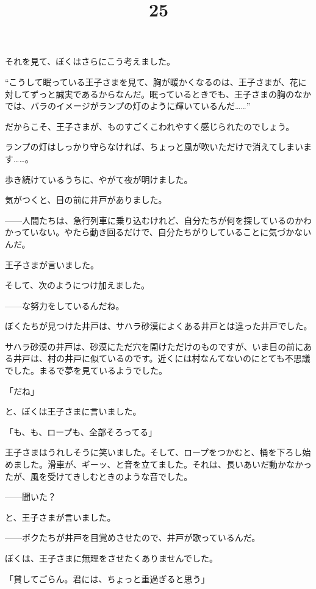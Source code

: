 それを見て、ぼくはさらにこう考えました。

“こうして眠っている王子さまを見て、胸が暖かくなるのは、王子さまが、花に対してずっと誠実であるからなんだ。眠っているときでも、王子さまの胸のなかでは、バラのイメージがランプの灯のように輝いているんだ……”

だからこそ、王子さまが、ものすごくこわれやすく感じられたのでしょう。

ランプの灯はしっかり守らなければ、ちょっと風が吹いただけで消えてしまいます……。

歩き続けているうちに、やがて夜が明けました。

気がつくと、目の前に井戸がありました。


\title{25}

——人間たちは、急行列車に乗り込むけれど、自分たちが何を探しているのかわかっていない。やたら動き回るだけで、自分たちがりしていることに気づかないんだ。

王子さまが言いました。

そして、次のようにつけ加えました。

——な努力をしているんだね。

ぼくたちが見つけた井戸は、サハラ砂漠によくある井戸とは違った井戸でした。

サハラ砂漠の井戸は、砂漠にただ穴を開けただけのものですが、いま目の前にある井戸は、村の井戸に似ているのです。近くには村なんてないのにとても不思議でした。まるで夢を見ているようでした。

「だね」

と、ぼくは王子さまに言いました。

「も、も、ロープも、全部そろってる」


王子さまはうれしそうに笑いました。そして、ロープをつかむと、桶を下ろし始めました。滑車が、ギーッ、と音を立てました。それは、長いあいだ動かなかったが、風を受けてきしむときのような音でした。

——聞いた？

と、王子さまが言いました。

——ボクたちが井戸を目覚めさせたので、井戸が歌っているんだ。

ぼくは、王子さまに無理をさせたくありませんでした。

「貸してごらん。君には、ちょっと重過ぎると思う」

